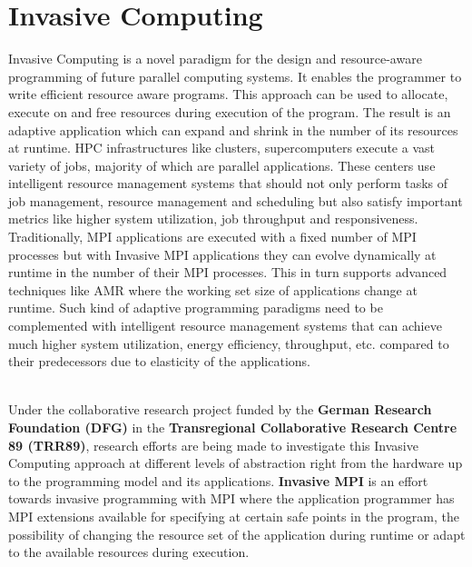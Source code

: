 \section{Invasive Computing}
Invasive Computing is a novel paradigm for the design and resource-aware programming of future parallel computing systems. It enables the programmer to write efficient resource aware programs. This approach can be used to allocate, execute on and free resources during execution of the program. The result is an adaptive application which can expand and shrink in the number of its resources at runtime. HPC infrastructures like clusters, supercomputers execute a vast variety of jobs, majority of which are parallel applications. These centers use intelligent resource management systems that should not only perform tasks of job management, resource management and scheduling but also satisfy important metrics like higher system utilization, job throughput and responsiveness. Traditionally, MPI applications are executed with a fixed number of MPI processes but with Invasive MPI applications they can evolve dynamically at runtime in the number of their MPI processes. This in turn supports advanced techniques like AMR where the working set size of applications change at runtime. Such kind of adaptive programming paradigms need to be complemented with intelligent resource management systems that can  achieve much higher system utilization, energy efficiency, throughput, etc. compared to their predecessors due to elasticity of the applications.\par
\noindent
\\Under the collaborative research project funded by the \textbf{German Research Foundation (DFG)} in the \textbf{Transregional Collaborative Research Centre 89 (TRR89)}, research efforts are being made to investigate this Invasive Computing approach at different levels of abstraction right from the hardware up to the programming model and its applications. \textbf{Invasive MPI} is an effort towards invasive programming with MPI where the application programmer has MPI extensions available for specifying at certain safe points in the program, the possibility of changing the resource set of the application during runtime or adapt to the available resources during execution.
